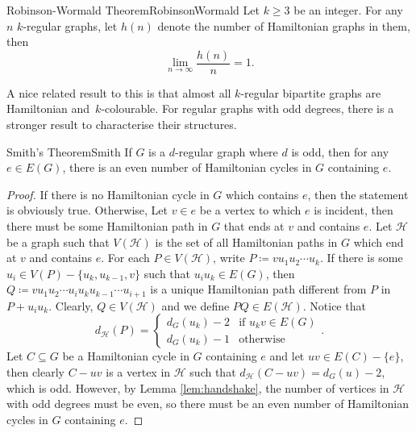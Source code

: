 \documentclass[math]{amznotes}
\theoremstyle{remark}
\newcommand{\0}{\mathbf{0}}
\newcommand{\1}{\mathbf{1}}
\begin{document}
\begin{thmbox}{Robinson-Wormald Theorem}{RobinsonWormald}
    Let $k \geq 3$ be an integer. For any $n$ $k$-regular graphs, let $h(n)$ denote the number of Hamiltonian graphs in them, then 
    \begin{equation*}
        \lim_{n \to \infty}\frac{h(n)}{n} = 1.
    \end{equation*}
\end{thmbox}
A nice related result to this is that almost all $k$-regular bipartite graphs are Hamiltonian and~$k$-colourable. For regular graphs with odd degrees, there is a stronger result to characterise their structures.
\begin{thmbox}{Smith's Theorem}{Smith}
    If $G$ is a $d$-regular graph where $d$ is odd, then for any $e \in E(G)$, there is an even number of Hamiltonian cycles in $G$ containing $e$.
    \tcblower
    \begin{proof}
        If there is no Hamiltonian cycle in $G$ which contains $e$, then the statement is obviously true. Otherwise, Let $v \in e$ be a vertex to which $e$ is incident, then there must be some Hamiltonian path in $G$ that ends at $v$ and contains $e$. Let $\mathcal{H}$ be a graph such that $V(\mathcal{H})$ is the set of all Hamiltonian paths in $G$ which end at $v$ and contains $e$. For each $P \in V(\mathcal{H})$, write $P \coloneqq vu_1u_2\cdots u_k$. If there is some $u_i \in V(P) - \{u_k, u_{k - 1}, v\}$ such that $u_iu_k \in E(G)$, then $Q \coloneqq vu_1u_2\cdots u_iu_ku_{k - 1}\cdots u_{i + 1}$ is a unique Hamiltonian path different from $P$ in $P + u_iu_k$. Clearly, $Q \in V(\mathcal{H})$ and we define $PQ \in E(\mathcal{H})$. Notice that 
        \begin{equation*}
            d_{\mathcal{H}}(P) = \begin{cases}
                d_G(u_k) - 2 & \textrm{if } u_kv \in E(G) \\
                d_G(u_k) - 1 & \textrm{otherwise}
            \end{cases}.
        \end{equation*}
        Let $C \subseteq G$ be a Hamiltonian cycle in $G$ containing $e$ and let $uv \in E(C) - \{e\}$, then clearly $C - uv$ is a vertex in $\mathcal{H}$ such that $d_{\mathcal{H}}(C - uv) = d_G(u) - 2$, which is odd. However, by Lemma \ref{lem:handshake}, the number of vertices in $\mathcal{H}$ with odd degrees must be even, so there must be an even number of Hamiltonian cycles in $G$ containing $e$.
    \end{proof}
\end{thmbox}
\end{document}
